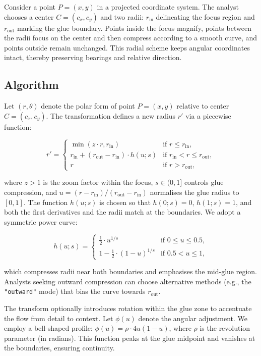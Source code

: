 Consider a point \(P = (x, y)\) in a projected coordinate system. The analyst chooses a center \(C = (c_x, c_y)\) and two radii: \(r_{\text{in}}\) delineating the focus region and \(r_{\text{out}}\)
marking the glue boundary. Points inside the focus magnify, points between the radii focus on the center and then compress according to a smooth curve, and points outside remain unchanged. This radial scheme keeps angular
coordinates intact, thereby preserving bearings and relative direction.

\hypertarget{algorithm}{%
\subsection{Algorithm}\label{algorithm}}

Let \((r, \theta)\) denote the polar form of point \(P = (x, y)\) relative to center \(C = (c_x, c_y)\). The transformation defines a new radius \(r'\) via a piecewise function:

\[
 r' = 
 \begin{cases}
   \min\left( z \cdot r, r_{\text{in}} \right) & \text{if } r \le r_{\text{in}}, \\
   r_{\text{in}} + (r_{\text{out}} - r_{\text{in}}) \cdot h(u; s) & \text{if } r_{\text{in}} < r \le r_{\text{out}}, \\
   r & \text{if } r > r_{\text{out}},
 \end{cases}
\]

where \(z > 1\) is the zoom factor within the focus, \(s \in (0, 1]\) controls glue compression, and
\(u = { (r - r_{\text{in}}) }/{ (r_{\text{out}} - r_{\text{in}}) }\) normalises the glue radius to
\([0,1]\). The function \(h(u; s)\) is chosen so that \(h(0; s) = 0\), \(h(1; s) = 1\), and both the
first derivatives and the radii match at the boundaries. We adopt a symmetric power curve:

\[
 h(u; s) = 
 \begin{cases}
   \tfrac{1}{2} \cdot u^{1/s} & \text{if } 0 \le u \le 0.5, \\
   1 - \tfrac{1}{2} \cdot (1 - u)^{1/s} & \text{if } 0.5 < u \le 1,
 \end{cases}
\]

which compresses radii near both boundaries and emphasises the mid-glue region. Analysts seeking
outward compression can choose alternative methods (e.g., the \texttt{"outward"} mode) that bias the curve
towards \(r_{\text{out}}\).

The transform optionally introduces rotation within the glue zone to accentuate the flow from detail
to context. Let \(\phi(u)\) denote the angular adjustment. We employ a bell-shaped profile:
\(\phi(u) = \rho \cdot 4u(1-u)\), where \(\rho\) is the revolution parameter (in radians). This
function peaks at the glue midpoint and vanishes at the boundaries, ensuring continuity.


